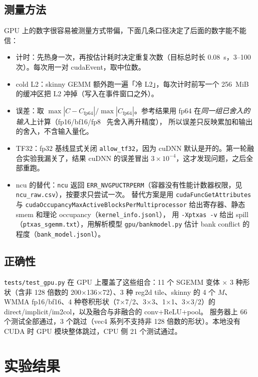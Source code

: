 \documentclass[11pt,a4paper]{ctexart}
\begin{document}
\subsection{测量方法}
GPU 上的数字很容易被测量方式带偏，下面几条口径决定了后面的数字能不能信：
\begin{itemize}
  \item 计时：先热身一次，再按估计耗时决定重复次数（目标总时长 0.08~s，3--100 次）。每次用一对 cudaEvent，取中位数。
  \item cold L2：skinny GEMM 额外跑一遍「冷 L2」，每次计时前写一个 256~MiB 的缓冲区把 L2 冲掉（写入在事件窗口之外）。
  \item 误差：取 $\max|C-C_{\mathrm{fp64}}|/\max|C_{\mathrm{fp64}}|$。参考结果用 fp64 在\emph{同一组已舍入的输入}上计算（fp16/bf16/fp8~\cite{micikevicius2022} 先舍入再升精度），
        所以误差只反映累加和输出的舍入，不含输入量化。
  \item TF32：fp32 基线显式关闭 \texttt{allow\_tf32}，因为 cuDNN 默认是开的。第一轮融合实验我漏关了，结果 cuDNN 的误差冒出 $3\times10^{-4}$，这才发现问题，之后全部重跑。
  \item ncu 的替代：\texttt{ncu} 返回 \texttt{ERR\_NVGPUCTRPERM}（容器没有性能计数器权限，见 \texttt{ncu\_raw.csv}），按要求只尝试一次。
        替代方案是用 \texttt{cudaFuncGetAttributes} 与 \texttt{cudaOccupancy\-MaxActive\-Blocks\-PerMultiprocessor} 给出寄存器、静态 smem 和理论 occupancy（\texttt{kernel\_info.jsonl}），
        用 \texttt{-Xptxas -v} 给出 spill（\texttt{ptxas\_sgemm.txt}），用解析模型 \texttt{gpu/bankmodel.py} 估计 bank conflict 的程度（\texttt{bank\_model.jsonl}）。
\end{itemize}

\subsection{正确性}
\texttt{tests/test\_gpu.py} 在 GPU 上覆盖了这些组合：11 个 SGEMM 变体 $\times$ 3 种形状（含非 128 倍数的 200$\times$136$\times$72）、3 种 reg2d tile、skinny 的 4 个 $M$、
WMMA fp16/bf16、4 种卷积形状（7$\times$7/2、3$\times$3、1$\times$1、3$\times$3/2）的 direct/implicit/im2col，以及融合与非融合的 conv+ReLU+pool。
服务器上 66 个测试全部通过，3 个跳过（vec4 系列不支持非 128 倍数的形状）。本地没有 CUDA 时 GPU 模块整体跳过，CPU 侧 21 个测试通过。

\section{实验结果}
\end{document}
